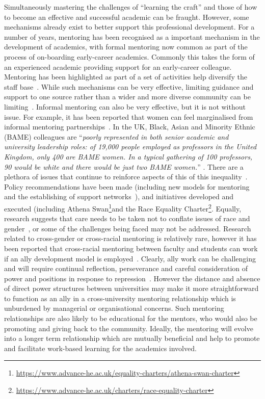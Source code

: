 \documentclass[sigconf]{acmart}
\begin{document}
Simultaneously mastering the challenges of ``learning the craft''
and those of how to become an effective and successful academic can be
fraught. However, some mechanisms already exist to better support this
professional development. For a number of years, mentoring has been
recognised as a important mechanism in the development of academics,
with formal mentoring now common as part of the process of on-boarding
early-career academics. Commonly this takes the form of an experienced
academic providing support for an early-career colleague. Mentoring
has been highlighted as part of a set of activities help diversify the
staff base~\cite{Golubchik2018}. While such mechanisms can be very
effective, limiting guidance and support to one source rather than a
wider and more diverse community can be
limiting~\cite{deJanasz}. Informal mentoring can also be very
effective, but it is not without issue. For example, it has been
reported that women can feel marginalised from informal mentoring
partnerships~\cite{gibson2006mentoring}. In the UK, Black, Asian and
Minority Ethnic (BAME) colleagues are ``\emph{poorly represented in
both senior academic and university leadership roles: of 19,000 people
employed as professors in the United Kingdom, only 400 are BAME
women. In a typical gathering of 100 professors, 90 would be white and
there would be just two BAME women.}''
\cite[p.~I]{UniversitiesUK19}. There are a plethora of issues that
continue to reinforce aspects of this of this
inequality~\cite{arday20}. Policy recommendations have been made
(including new models for mentoring and the establishing of support
networks~\cite{bhopal2014experiences}), and initiatives developed and
executed (including Athena Swan\footnote{\url{https://www.advance-he.ac.uk/equality-charters/athena-swan-charter}}and
the Race Equality Charter\footnote{\url{
    https://www.advance-he.ac.uk/charters/race-equality-charter}}. Equally,
research suggests that care needs to be taken not to conflate issues
of race and gender~\cite{Bhopal19}, or some of the challenges being
faced may not be addressed. Research related to cross-gender or
cross-racial mentoring is relatively rare, however it has been
reported that cross-racial mentoring between faculty and students can
work if an ally development model is
employed~\cite{reddick2016don}. Clearly, ally work can be challenging and
will require continual reflection, perseverance and careful
consideration of power and positions in response to
repression~\cite{Patton2015}. However the distance and absence of
direct power structures between universities may make it more
straightforward to function as an ally in a cross-university mentoring
relationship which is unburdened by managerial or organisational
concerns. Such mentoring relationships are also likely to be
educational for the mentors, who would also be promoting and giving
back to the community. Ideally, the mentoring will evolve into a
longer term relationship which are mutually beneficial and help to
promote and facilitate work-based learning for the academics involved.
\end{document}
